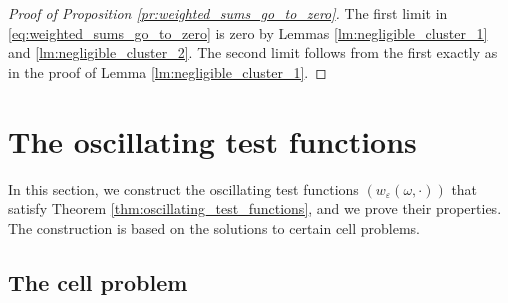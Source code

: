 \documentclass{article}
\numberwithin{equation}{section}
\theoremstyle{definition}
\theoremstyle{remark}
\begin{document}
\begin{proof}[Proof of Proposition \ref{pr:weighted_sums_go_to_zero}]
    The first limit in \eqref{eq:weighted_sums_go_to_zero} is zero by Lemmas \ref{lm:negligible_cluster_1} and \ref{lm:negligible_cluster_2}. The second limit follows from the first exactly as in the proof of Lemma \ref{lm:negligible_cluster_1}.
\end{proof}

\section{The oscillating test functions} \label{sec:otf}

In this section, we construct the oscillating test functions $(w_\varepsilon(\omega, \cdot))$ that satisfy Theorem \ref{thm:oscillating_test_functions}, and we prove their properties. The construction is based on the solutions to certain cell problems.

\subsection{The cell problem}
\end{document}
